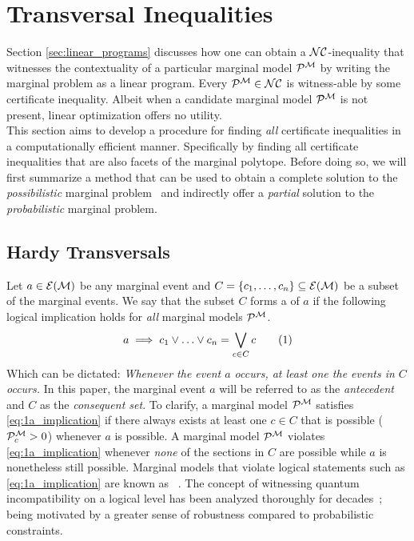 \documentclass[aps, 10pt, english, twoside, pra, nofootinbib, longbibliography]{revtex4-1}
\begin{document}

    \section{Transversal Inequalities}

    Section \ref{sec:linear_programs} discusses how one can obtain a $\mathcal{NC}$-inequality that witnesses the contextuality of a particular marginal model $\probvec^{\mscenario}$ by writing the marginal problem as a linear program. Every $\probvec^{\mscenario} \in \s{NC}$ is witness-able by some certificate inequality. Albeit when a candidate marginal model $\probvec^{\mscenario}$ is not present, linear optimization offers no utility. \\

    This section aims to develop a procedure for finding \textit{all} certificate inequalities in a computationally efficient manner. Specifically by finding all certificate inequalities that are also facets of the marginal polytope. Before doing so, we will first summarize a method  that can be used to obtain a complete solution to the \textit{possibilistic} marginal problem~\cite{Mansfield_2012} and indirectly offer a \textit{partial} solution to the \textit{probabilistic} marginal problem.

    \subsection{Hardy Transversals}
    \label{sec:logical_inequalities}
    Let $a \in \Events{\mscenario}$ be any marginal event and $C = \bc{c_1, \ldots, c_{n}} \subseteq \Events{\mscenario}$ be a subset of the marginal events. We say that the subset $C$ forms a  of $a$ if the following logical implication holds for \textit{all} marginal models $\probvec^{\mscenario}$.
    \[ a \implies c_1 \vee \ldots \vee c_n = \bigvee_{c \in C} c \eq \label{eq:1a_implication} \]
    Which can be dictated: \textit{Whenever the event $a$ occurs, at least one the events in $C$ occurs.} In this paper, the marginal event $a$ will be referred to as the \textit{antecedent} and $C$ as the \textit{consequent set}. To clarify, a marginal model $\probvec^{\mscenario}$ satisfies \cref{eq:1a_implication} if there always exists at least one $c \in C$ that is possible ($\probvec^{\mscenario}_c > 0$) whenever $a$ is possible. A marginal model $\probvec^{\mscenario}$ violates \cref{eq:1a_implication} whenever \textit{none} of the sections in $C$ are possible while $a$ is nonetheless still possible. Marginal models that violate logical statements such as \cref{eq:1a_implication} are known as ~\cite{Inflation,Mansfield_2012,Mancinska_2014}. The concept of witnessing quantum incompatibility on a logical level has been analyzed thoroughly for decades~\cite{Greenberger_1990,Abramsky_2012}; being motivated by a greater sense of robustness compared to probabilistic constraints. \\
\end{document}
